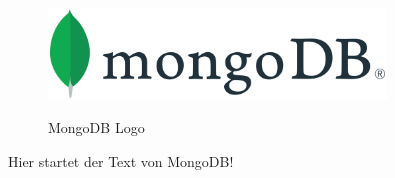 \begin{figure}[h!]
    \centering
    \includegraphics[width=0.8\textwidth]{pics/mongodb.png}
    \caption{MongoDB Logo}
    \cite{database_mongodb_logo}
    \label{fig:enter-label}
\end{figure}
Hier startet der Text von MongoDB!